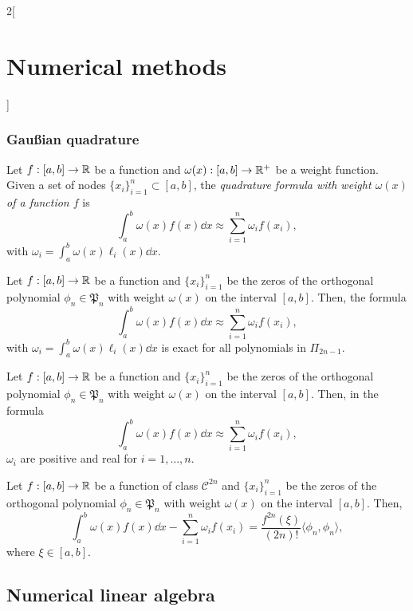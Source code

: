 \documentclass[../../../main.tex]{subfiles}
\begin{document}
\begin{multicols}{2}[\section{Numerical methods}]
\subsubsection*{Gau\ss ian quadrature}
\begin{definition}
    Let $f:[a,b]\rightarrow\mathbb{R}$ be a function and $\omega(x):[a,b]\rightarrow\mathbb{R}^+$ be a weight function. Given a set of nodes $\{x_i\}_{i=1}^n\subset[a,b]$, the \textit{quadrature formula with weight $\omega(x)$ of a function $f$} is $$\int_a^b\omega(x)f(x)\dd x\approx\sum_{i=1}^n\omega_if(x_i),$$ with $\omega_i=\int_a^b\omega(x)\ell_i(x)\dd x$.
\end{definition}
\begin{lemma}
    Let $f:[a,b]\rightarrow\mathbb{R}$ be a function and $\{x_i\}_{i=1}^n$ be the zeros of the orthogonal polynomial $\phi_n\in\mathfrak{P}_n$ with weight $\omega(x)$ on the interval $[a,b]$. Then, the formula $$\int_a^b\omega(x)f(x)\dd x\approx\sum_{i=1}^n\omega_if(x_i),$$ with $\omega_i=\int_a^b\omega(x)\ell_i(x)\dd x$ is exact for all polynomials in $\Pi_{2n-1}$.
\end{lemma}
\begin{prop}
    Let $f:[a,b]\rightarrow\mathbb{R}$ be a function and $\{x_i\}_{i=1}^n$ be the zeros of the orthogonal polynomial $\phi_n\in\mathfrak{P}_n$ with weight $\omega(x)$ on the interval $[a,b]$. Then, in the formula $$\int_a^b\omega(x)f(x)\dd x\approx\sum_{i=1}^n\omega_if(x_i),$$ $\omega_i$ are positive and real for $i=1,\ldots,n$.
\end{prop}
\begin{theorem}
    Let $f:[a,b]\rightarrow\mathbb{R}$ be a function of class $\mathcal{C}^{2n}$ and $\{x_i\}_{i=1}^n$ be the zeros of the orthogonal polynomial $\phi_n\in\mathfrak{P}_n$ with weight $\omega(x)$ on the interval $[a,b]$. Then, $$\int_a^b\omega(x)f(x)\dd x-\sum_{i=1}^n\omega_if(x_i)=\frac{f^{2n}(\xi)}{(2n)!}\langle\phi_n,\phi_n\rangle,$$ where $\xi\in[a,b]$. 
\end{theorem}
\subsection{Numerical linear algebra}

\end{multicols}
\end{document}
